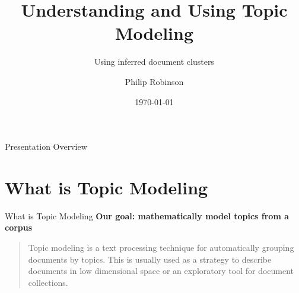 \documentclass[10pt]{beamer}
\title{Understanding and Using Topic Modeling}
\subtitle{Using inferred document clusters}
\author{Philip Robinson}
\date{\today}
\institute{Presented to Knowlege Mavens}
\begin{document}
\begin{frame}
  \titlepage

\end{frame}


\begin{frame}{Presentation Overview}
  \tableofcontents

\end{frame}

\section{What is Topic Modeling}

\begin{frame}{What is Topic Modeling}
  {\bf Our goal: mathematically model topics from a corpus}

  \begin{quote}
    Topic modeling is a text processing technique for automatically grouping documents by topics. This is usually used as a strategy to describe documents in low dimensional space or an exploratory tool for document collections.
  \end{quote}
\end{frame}

\newcommand{\Food}[1]{\colorbox{orange!30}{#1}\xspace}
\newcommand{\Travel}[1]{\colorbox{blue!30}{#1}\xspace}
\newcommand{\Time}[1]{\colorbox{green!30}{#1}\xspace}
\newcommand{\Document}[1]{\fbox{\begin{minipage}{\columnwidth}#1\end{minipage}}}
\end{document}
